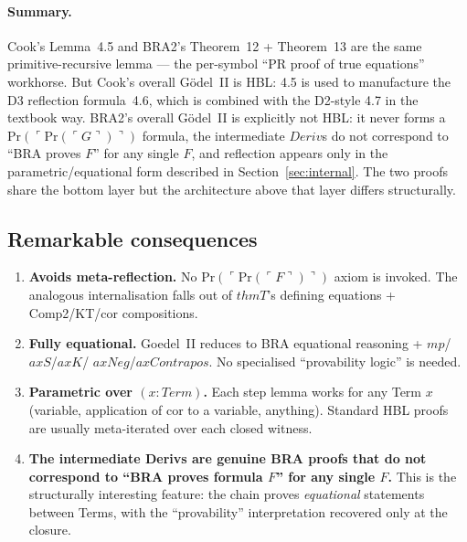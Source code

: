\documentclass[11pt]{article}
\begin{document}
\paragraph{Summary.}
Cook's Lemma~4.5 and BRA2's Theorem~12 + Theorem~13 are the same
primitive-recursive lemma --- the per-symbol ``PR proof of true
equations'' workhorse.  But Cook's overall G\"odel~II is HBL: 4.5
is used to manufacture the D3 reflection formula~4.6, which is
combined with the D2-style 4.7 in the textbook way.  BRA2's overall
G\"odel~II is explicitly not HBL: it never forms a
$\mathrm{Pr}(\ulcorner \mathrm{Pr}(\ulcorner G\urcorner)\urcorner)$
formula, the intermediate $\mathit{Deriv}$s do not correspond to
``BRA proves $F$'' for any single $F$, and reflection appears only
in the parametric/equational form described in
Section~\ref{sec:internal}.  The two proofs share the bottom layer
but the architecture above that layer differs structurally.

\subsection{Remarkable consequences}

\begin{enumerate}
  \item \textbf{Avoids meta-reflection.}  No $\mathrm{Pr}(\ulcorner
        \mathrm{Pr}(\ulcorner F\urcorner)\urcorner)$ axiom is invoked.
        The analogous internalisation falls out of $\mathit{thmT}$'s
        defining equations + Comp2/KT/cor compositions.
  \item \textbf{Fully equational.}  Goedel~II reduces to BRA equational
        reasoning + $\mathit{mp}$/$\mathit{axS}$/$\mathit{axK}$/
        $\mathit{axNeg}$/$\mathit{axContrapos}$.  No specialised
        ``provability logic'' is needed.
  \item \textbf{Parametric over $(x : \mathit{Term})$.}  Each step lemma
        works for any Term $x$ (variable, application of cor to a
        variable, anything).  Standard HBL proofs are usually
        meta-iterated over each closed witness.
  \item \textbf{The intermediate Derivs are genuine BRA proofs that do
        not correspond to ``BRA proves formula $F$'' for any single
        $F$.}  This is the structurally interesting feature: the chain
        proves \emph{equational} statements between Terms, with the
        ``provability'' interpretation recovered only at the closure.
\end{enumerate}
\end{document}
